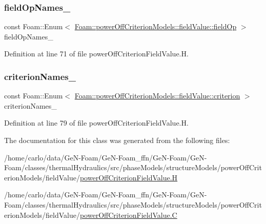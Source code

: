 \subsubsection{\texorpdfstring{field\+Op\+Names\+\_\+}{fieldOpNames\_}}
{\footnotesize\ttfamily const Foam\+::\+Enum$<$ \hyperlink{classFoam_1_1powerOffCriterionModels_1_1fieldValue_a2a8a9cf981c246590644d7a7c9d8f2eb}{Foam\+::power\+Off\+Criterion\+Models\+::field\+Value\+::field\+Op} $>$ field\+Op\+Names\+\_\+\hspace{0.3cm}{\ttfamily [static]}}



Definition at line 71 of file power\+Off\+Criterion\+Field\+Value.\+H.

\mbox{\label{classFoam_1_1powerOffCriterionModels_1_1fieldValue_a08173cdb919fefba739a97e6da4949a3}} 
\subsubsection{\texorpdfstring{criterion\+Names\+\_\+}{criterionNames\_}}
{\footnotesize\ttfamily const Foam\+::\+Enum$<$ \hyperlink{classFoam_1_1powerOffCriterionModels_1_1fieldValue_a870e2f6afd9ddff2973bfa200173f120}{Foam\+::power\+Off\+Criterion\+Models\+::field\+Value\+::criterion} $>$ criterion\+Names\+\_\+\hspace{0.3cm}{\ttfamily [static]}}



Definition at line 79 of file power\+Off\+Criterion\+Field\+Value.\+H.



The documentation for this class was generated from the following files\+:\begin{DoxyCompactItemize}
\item 
/home/carlo/data/\+Ge\+N-\/\+Foam/\+Ge\+N-\/\+Foam\+\_\+ffn/\+Ge\+N-\/\+Foam/\+Ge\+N-\/\+Foam/classes/thermal\+Hydraulics/src/phase\+Models/structure\+Models/power\+Off\+Criterion\+Models/field\+Value/\hyperlink{powerOffCriterionFieldValue_8H}{power\+Off\+Criterion\+Field\+Value.\+H}\item 
/home/carlo/data/\+Ge\+N-\/\+Foam/\+Ge\+N-\/\+Foam\+\_\+ffn/\+Ge\+N-\/\+Foam/\+Ge\+N-\/\+Foam/classes/thermal\+Hydraulics/src/phase\+Models/structure\+Models/power\+Off\+Criterion\+Models/field\+Value/\hyperlink{powerOffCriterionFieldValue_8C}{power\+Off\+Criterion\+Field\+Value.\+C}\end{DoxyCompactItemize}
